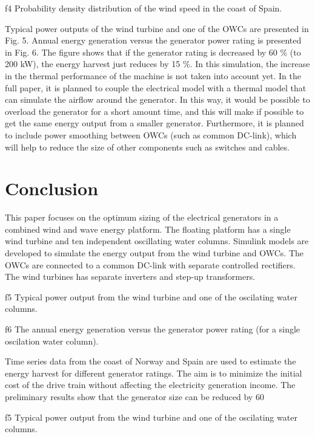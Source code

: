 \documentclass[twoside]{article}
\begin{document}
\begin{multicols}{2}
{f4} Probability density distribution of the wind speed in the coast of Spain.

Typical power outputs of the wind turbine and one of the OWCs are presented in Fig. 5. Annual energy generation versus the generator power rating is presented in Fig. 6. The figure shows that if the generator rating is decreased by 60 \% (to 200 kW), the energy harvest just reduces by 15 \%.  In this simulation, the increase in the thermal performance of the machine is not taken into account yet. In the full paper, it is planned to couple the electrical model with a thermal model that can simulate the airflow around the generator. In this way, it would be possible to overload the generator  for a short amount time, and this will make if possible to get the same energy output from a smaller generator. Furthermore, it is planned to include power smoothing between OWCs (such as common DC-link), which will help to reduce the size of other components such as switches and cables.

\section{Conclusion}

This paper focuses on the optimum sizing of the electrical generators in a combined wind and wave energy platform. The floating platform has a single wind turbine and ten independent oscillating water columns. Simulink models are developed to simulate the energy output from the wind turbine and OWCs. The OWCs are connected to a common DC-link with separate controlled rectifiers. The wind turbines has separate inverters and step-up transformers.

{f5} Typical power output from the wind turbine and one of the oscilating water columns.

{f6} The annual energy generation versus the generator power rating (for a single oscilation water column).

Time series data from the coast of Norway and Spain are used to estimate the energy harvest for different generator ratings. The aim is to minimize the initial cost of the drive train without affecting the electricity generation income. The preliminary results show that the generator size can be reduced by 60%

{f5} Typical power output from the wind turbine and one of the oscilating water columns.


\end{multicols}
\end{document}
